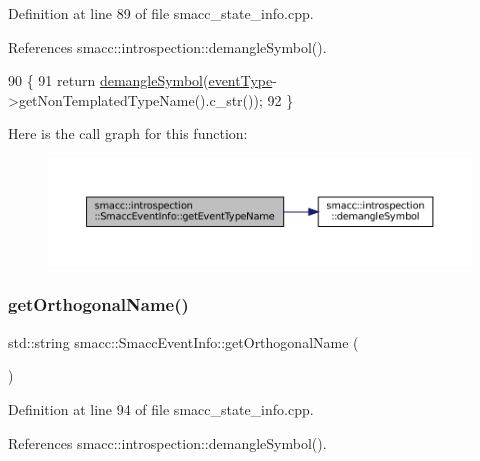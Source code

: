 Definition at line 89 of file smacc\+\_\+state\+\_\+info.\+cpp.



References smacc\+::introspection\+::demangle\+Symbol().


\begin{DoxyCode}
90 \{
91     \textcolor{keywordflow}{return} \hyperlink{namespacesmacc_1_1introspection_a2f495108db3e57604d8d3ff5ef030302}{demangleSymbol}(\hyperlink{structsmacc_1_1introspection_1_1SmaccEventInfo_af3bdf1abf797864e681662d92a5515f9}{eventType}->getNonTemplatedTypeName().c\_str());
92 \}
\end{DoxyCode}
Here is the call graph for this function\+:
\nopagebreak
\begin{figure}[H]
\begin{center}
\leavevmode
\includegraphics[width=350pt]{structsmacc_1_1introspection_1_1SmaccEventInfo_ae0ed6a9506dbe526269a0bd956a71044_cgraph}
\end{center}
\end{figure}
\mbox{\label{structsmacc_1_1introspection_1_1SmaccEventInfo_a7a507eea65876ba22033300f316cae89}} 
\subsubsection{\texorpdfstring{get\+Orthogonal\+Name()}{getOrthogonalName()}}
{\footnotesize\ttfamily std\+::string smacc\+::\+Smacc\+Event\+Info\+::get\+Orthogonal\+Name (\begin{DoxyParamCaption}{ }\end{DoxyParamCaption})}



Definition at line 94 of file smacc\+\_\+state\+\_\+info.\+cpp.



References smacc\+::introspection\+::demangle\+Symbol().


